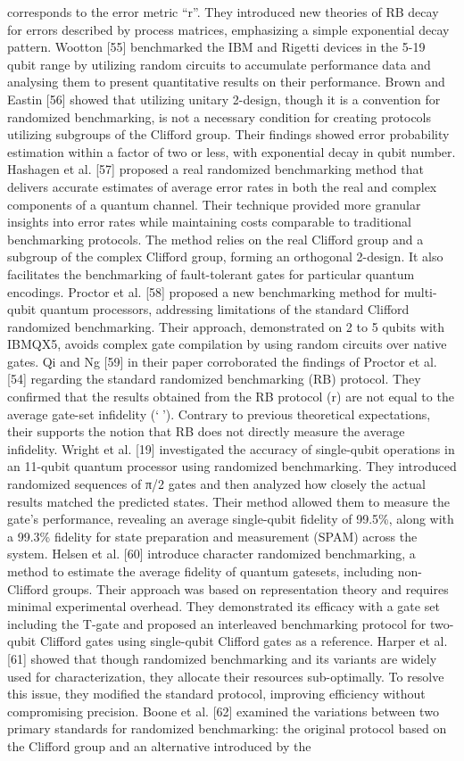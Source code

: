 corresponds to the error metric “r”. They introduced new theories of RB decay for errors described by process matrices, emphasizing a simple exponential decay pattern. Wootton [55] benchmarked the IBM and Rigetti devices in the 5-19 qubit range by utilizing random circuits to accumulate performance data and analysing them to present quantitative results on their performance. Brown and Eastin [56] showed that utilizing unitary 2-design, though it is a convention for randomized benchmarking, is not a necessary condition for creating protocols utilizing subgroups of the Clifford group. Their findings showed error probability estimation within a factor of two or less, with exponential decay in qubit number. Hashagen et al. [57] proposed a real randomized benchmarking method that delivers accurate estimates of average error rates in both the real and complex components of a quantum channel. Their technique provided more granular insights into error rates while maintaining costs comparable to traditional benchmarking protocols. The method relies on the real Clifford group and a subgroup of the complex Clifford group, forming an orthogonal 2-design. It also facilitates the benchmarking of fault-tolerant gates for particular quantum encodings. Proctor et al. [58] proposed a new benchmarking method for multi-qubit quantum processors, addressing limitations of the standard Clifford randomized benchmarking. Their approach, demonstrated on 2 to 5 qubits with IBMQX5, avoids complex gate compilation by using random circuits over native gates. Qi and Ng [59] in their paper corroborated the findings of Proctor et al. [54] regarding the standard randomized benchmarking (RB) protocol. They confirmed that the results obtained from the RB protocol (r) are not equal to the average gate-set infidelity (‘’). Contrary to previous theoretical expectations, their supports the notion that RB does not directly measure the average infidelity. Wright et al. [19] investigated the accuracy of single-qubit operations in an 11-qubit quantum processor using randomized benchmarking. They introduced randomized sequences of π/2 gates and then analyzed how closely the actual results matched the predicted states. Their method allowed them to measure the gate’s performance, revealing an average single-qubit fidelity of 99.5\%, along with a 99.3\% fidelity for state preparation and measurement (SPAM) across the system. Helsen et al. [60] introduce character randomized benchmarking, a method to estimate the average fidelity of quantum gatesets, including non-Clifford groups. Their approach was based on representation theory and requires minimal experimental overhead. They demonstrated its efficacy with a gate set including the T-gate and proposed an interleaved benchmarking protocol for two-qubit Clifford gates using single-qubit Clifford gates as a reference. Harper et al. [61] showed that though randomized benchmarking and its variants are widely used for characterization, they allocate their resources sub-optimally. To resolve this issue, they modified the standard protocol, improving efficiency without compromising precision. Boone et al. [62] examined the variations between two primary standards for randomized benchmarking: the original protocol based on the Clifford group and an alternative introduced by the 